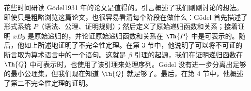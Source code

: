 \documentclass[../../../include/open-logic-section]{subfiles}
\begin{document}



花些时间研读 Gödel1931 年的论文是值得的。引言概述了我们刚刚讨论的想法。即使只是粗略浏览这篇论文，也很容易看清每个阶段在做什么：Gödel 首先描述了形式系统 $P$（语法、公理、证明规则）；然后定义了原始递归函数和关系；接着证明 $x B y$ 是原始递归的，并论证原始递归函数和关系在 $\Th{P}$ 中是可表示的。随后，他如上所述地证明了不完全性定理。在第 3 节中，他说明了可以将不可证的断言取为算术语言中的一个语句。这就是 $\beta$ 引理的起源，我们在证明递归函数在 $\Th{Q}$ 中可表示时，也使用了该引理来处理序列。Gödel 没有进一步分离出足够的最小公理集，但我们现在知道 $\Th{Q}$ 就足够了。最后，在第 4 节中，他概述了第二不完全性定理的证明。
\end{document}
